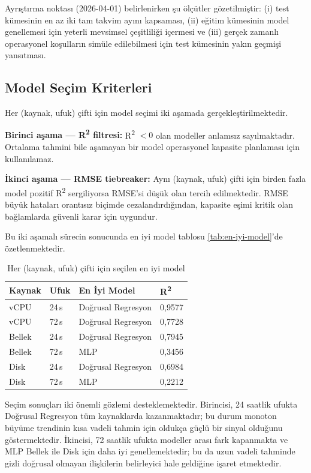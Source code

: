 Ayrıştırma noktası (2026-04-01) belirlenirken şu ölçütler gözetilmiştir: (i) test kümesinin en az iki tam takvim ayını kapsaması, (ii) eğitim kümesinin model genellemesi için yeterli mevsimsel çeşitliliği içermesi ve (iii) gerçek zamanlı operasyonel koşulların simüle edilebilmesi için test kümesinin yakın geçmişi yansıtması.

\subsection{Model Seçim Kriterleri}

Her (kaynak, ufuk) çifti için model seçimi iki aşamada gerçekleştirilmektedir.

\textbf{Birinci aşama — R\textsuperscript{2} filtresi:} R\textsuperscript{2} $< 0$ olan modeller anlamsız sayılmaktadır.
Ortalama tahmini bile aşamayan bir model operasyonel kapasite planlaması için kullanılamaz.

\textbf{İkinci aşama — RMSE tiebreaker:} Aynı (kaynak, ufuk) çifti için birden fazla model pozitif R\textsuperscript{2} sergiliyorsa RMSE'si düşük olan tercih edilmektedir.
RMSE büyük hataları orantısız biçimde cezalandırdığından, kapasite eşimi kritik olan bağlamlarda güvenli karar için uygundur.

Bu iki aşamalı sürecin sonucunda en iyi model tablosu \autoref{tab:en-iyi-model}'de özetlenmektedir.

\begin{table}[htbp]
    \centering
    \caption{Her (kaynak, ufuk) çifti için seçilen en iyi model}
    \label{tab:en-iyi-model}
    \begin{tabular}{llll}
        \textbf{Kaynak} & \textbf{Ufuk} & \textbf{En İyi Model} & \textbf{R\textsuperscript{2}} \\
        \hline
        vCPU   & 24\,s  & Doğrusal Regresyon & 0{,}9577 \\
        vCPU   & 72\,s  & Doğrusal Regresyon & 0{,}7728 \\
        Bellek & 24\,s  & Doğrusal Regresyon & 0{,}7945 \\
        Bellek & 72\,s  & MLP                & 0{,}3456 \\
        Disk   & 24\,s  & Doğrusal Regresyon & 0{,}6984 \\
        Disk   & 72\,s  & MLP                & 0{,}2212 \\
    \end{tabular}
\end{table}

Seçim sonuçları iki önemli gözlemi desteklemektedir.
Birincisi, 24 saatlik ufukta Doğrusal Regresyon tüm kaynaklarda kazanmaktadır; bu durum monoton büyüme trendinin kısa vadeli tahmin için oldukça güçlü bir sinyal olduğunu göstermektedir.
İkincisi, 72 saatlik ufukta modeller arası fark kapanmakta ve MLP Bellek ile Disk için daha iyi genellemektedir; bu da uzun vadeli tahminde gizli doğrusal olmayan ilişkilerin belirleyici hale geldiğine işaret etmektedir.


